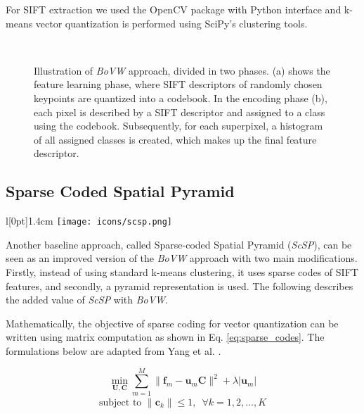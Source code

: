 For SIFT extraction we used the OpenCV \cite{openCV} package with Python interface and k-means vector quantization is performed using SciPy's \cite{scipy} clustering tools.

\begin{figure}[htbp]
  \centering
  \\
  \caption[BoVW illustration]{Illustration of \textit{BoVW} approach, divided in two phases. (a) shows the feature learning phase, where SIFT descriptors of randomly chosen keypoints are quantized into a codebook. In the encoding phase (b), each pixel is described by a SIFT descriptor and assigned to a class using the codebook. Subsequently, for each superpixel, a histogram of all assigned classes is created, which makes up the final feature descriptor.}
  \label{fig:BoVW_approch}  
\end{figure}

\subsection{Sparse Coded Spatial Pyramid} \label{scp}
\begingroup
\setlength\intextsep{0pt}
\begin{wrapfigure}[4]{l}[0pt]{1.4cm}
\texttt{[image: icons/scsp.png]}
\end{wrapfigure}

Another baseline approach, called Sparse-coded Spatial Pyramid (\textit{ScSP}), can be seen as an improved version of the \textit{BoVW} approach with two main modifications. Firstly, instead of using standard k-means clustering, it uses sparse codes of SIFT features, and secondly, a pyramid representation is used. The following describes the added value of \textit{ScSP} with \textit{BoVW}.

\endgroup


Mathematically, the objective of sparse coding for vector quantization can be written using matrix computation as shown in Eq. \ref{eq:sparse_codes}. The formulations below are adapted from Yang et al. \cite{yang09}.

\begin{samepage}
\begin{equation}
  \min_{\boldsymbol{U,C}} \sum_{m=1}^M \|\boldsymbol{f}_m - \boldsymbol{u}_m \boldsymbol{C}\|^2 + \lambda |\boldsymbol{u}_m|
  \label{eq:sparse_codes} 
\end{equation}
\begin{align*}
  \textrm{subject to } \|\boldsymbol{c}_k\| \leq 1, \hspace{6pt} \forall{k} = 1,2,...,K
\end{align*}
\end{samepage}

